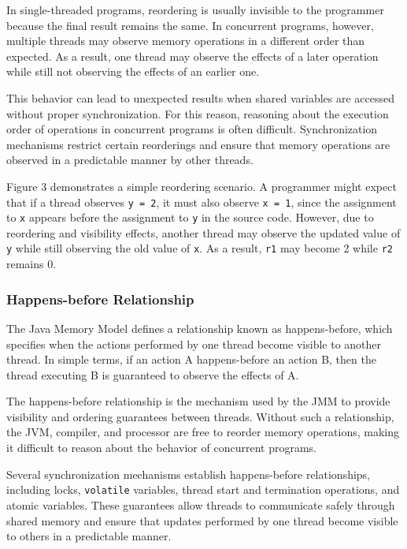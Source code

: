 In single-threaded programs, reordering is usually invisible to the programmer because the final result remains the same. In concurrent programs, however, multiple threads may observe memory operations in a different order than expected. As a result, one thread may observe the effects of a later operation while still not observing the effects of an earlier one. \cite{java-concurrency}\cite{jsr133-faq}

This behavior can lead to unexpected results when shared variables are accessed without proper synchronization. For this reason, reasoning about the execution order of operations in concurrent programs is often difficult. Synchronization mechanisms restrict certain reorderings and ensure that memory operations are observed in a predictable manner by other threads. \cite{java-concurrency}\cite{jsr133-faq}


Figure 3 demonstrates a simple reordering scenario. A programmer might expect that if a thread observes \texttt{y = 2}, it must also observe \texttt{x = 1}, since the assignment to \texttt{x} appears before the assignment to \texttt{y} in the source code. However, due to reordering and visibility effects, another thread may observe the updated value of \texttt{y} while still observing the old value of \texttt{x}. As a result, \texttt{r1} may become 2 while \texttt{r2} remains 0.

\subsubsection{Happens-before Relationship}
The Java Memory Model defines a relationship known as happens-before, which specifies when the actions performed by one thread become visible to another thread. In simple terms, if an action A happens-before an action B, then the thread executing B is guaranteed to observe the effects of A. \cite{java-concurrency}

The happens-before relationship is the mechanism used by the JMM to provide visibility and ordering guarantees between threads. Without such a relationship, the JVM, compiler, and processor are free to reorder memory operations, making it difficult to reason about the behavior of concurrent programs. \cite{java-concurrency}

Several synchronization mechanisms establish happens-before relationships, including locks, \texttt{volatile} variables, thread start and termination operations, and atomic variables. These guarantees allow threads to communicate safely through shared memory and ensure that updates performed by one thread become visible to others in a predictable manner. \cite{java-concurrency}

